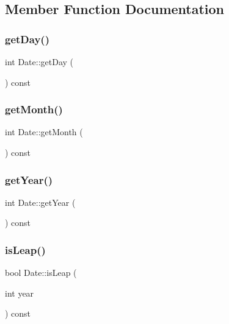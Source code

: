 \subsection{Member Function Documentation}
\hypertarget{class_date_a0f253815240e70f4c39cb93cc68bd3f4}{}\label{class_date_a0f253815240e70f4c39cb93cc68bd3f4} 
\subsubsection{\texorpdfstring{get\+Day()}{getDay()}}
{\footnotesize\ttfamily int Date\+::get\+Day (\begin{DoxyParamCaption}{ }\end{DoxyParamCaption}) const}

\hypertarget{class_date_a332f6e3a2f6a40d73742b6dab7be0f64}{}\label{class_date_a332f6e3a2f6a40d73742b6dab7be0f64} 
\subsubsection{\texorpdfstring{get\+Month()}{getMonth()}}
{\footnotesize\ttfamily int Date\+::get\+Month (\begin{DoxyParamCaption}{ }\end{DoxyParamCaption}) const}

\hypertarget{class_date_a8b0869f34c2b38d108ab83ee2e770e5d}{}\label{class_date_a8b0869f34c2b38d108ab83ee2e770e5d} 
\subsubsection{\texorpdfstring{get\+Year()}{getYear()}}
{\footnotesize\ttfamily int Date\+::get\+Year (\begin{DoxyParamCaption}{ }\end{DoxyParamCaption}) const}

\hypertarget{class_date_a434957869afa4b4e1275e00fe6a67216}{}\label{class_date_a434957869afa4b4e1275e00fe6a67216} 
\subsubsection{\texorpdfstring{is\+Leap()}{isLeap()}}
{\footnotesize\ttfamily bool Date\+::is\+Leap (\begin{DoxyParamCaption}\item[{int}]{year }\end{DoxyParamCaption}) const\hspace{0.3cm}{\ttfamily [private]}}


